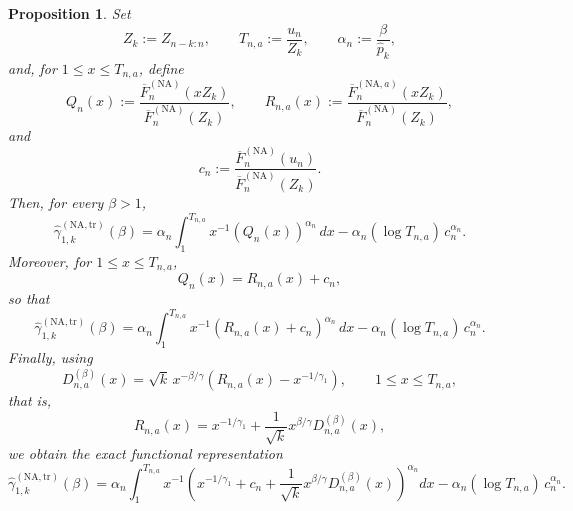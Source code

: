 \documentclass[reqno,openbib,runningheads,a4paper,12pt]{amsart}%
\newtheorem{proposition}{Proposition}[section]
\begin{document}
\begin{proposition}
\label{prop:app-functional} Set
\[
Z_{k}:=Z_{n-k:n}, \qquad T_{n,a}:=\frac{u_{n}}{Z_{k}}, \qquad\alpha_{n}%
:=\frac{\beta}{\widehat{p}_{k}},
\]
and, for $1\leq x\leq T_{n,a}$, define
\[
Q_{n}(x) := \frac{\overline{F}_{n}^{(\mathrm{NA})}(xZ_{k})} {\overline{F}%
_{n}^{(\mathrm{NA})}(Z_{k})}, \qquad R_{n,a}(x) := \frac{\overline{F}%
_{n}^{(\mathrm{NA},a)}(xZ_{k})} {\overline{F}_{n}^{(\mathrm{NA})}(Z_{k})},
\]
and
\[
c_{n} := \frac{\overline{F}_{n}^{(\mathrm{NA})}(u_{n})} {\overline{F}%
_{n}^{(\mathrm{NA})}(Z_{k})}.
\]
Then, for every $\beta>1$,
\begin{equation}
\widehat{\gamma}_{1,k}^{(\mathrm{NA,tr})}(\beta) = \alpha_{n} \int%
_{1}^{T_{n,a}} x^{-1} \left(  Q_{n}(x)\right)  ^{\alpha_{n}} \,dx - \alpha
_{n}(\log T_{n,a})\,c_{n}^{\alpha_{n}}. \label{eq:app-functional-Q}%
\end{equation}
Moreover, for $1\leq x\leq T_{n,a}$,
\[
Q_{n}(x)=R_{n,a}(x)+c_{n},
\]
so that
\begin{equation}
\widehat{\gamma}_{1,k}^{(\mathrm{NA,tr})}(\beta) = \alpha_{n} \int%
_{1}^{T_{n,a}} x^{-1} \left(  R_{n,a}(x)+c_{n}\right)  ^{\alpha_{n}} \,dx -
\alpha_{n}(\log T_{n,a})\,c_{n}^{\alpha_{n}}. \label{eq:app-functional-R}%
\end{equation}
Finally, using
\[
D_{n,a}^{(\beta)}(x) = \sqrt{k}\,x^{-\beta/\gamma} \left(  R_{n,a}%
(x)-x^{-1/\gamma_{1}} \right)  , \qquad1\leq x\leq T_{n,a},
\]
that is,
\[
R_{n,a}(x) = x^{-1/\gamma_{1}} + \frac{1}{\sqrt{k}}x^{\beta/\gamma}%
D_{n,a}^{(\beta)}(x),
\]
we obtain the exact functional representation
\begin{equation}
\widehat{\gamma}_{1,k}^{(\mathrm{NA,tr})}(\beta) = \alpha_{n} \int%
_{1}^{T_{n,a}} x^{-1} \left(  x^{-1/\gamma_{1}} + c_{n} + \frac{1}{\sqrt{k}%
}x^{\beta/\gamma}D_{n,a}^{(\beta)}(x) \right)  ^{\alpha_{n}} dx - \alpha
_{n}(\log T_{n,a})\,c_{n}^{\alpha_{n}}. \label{eq:app-functional-D}%
\end{equation}

\end{proposition}
\end{document}
